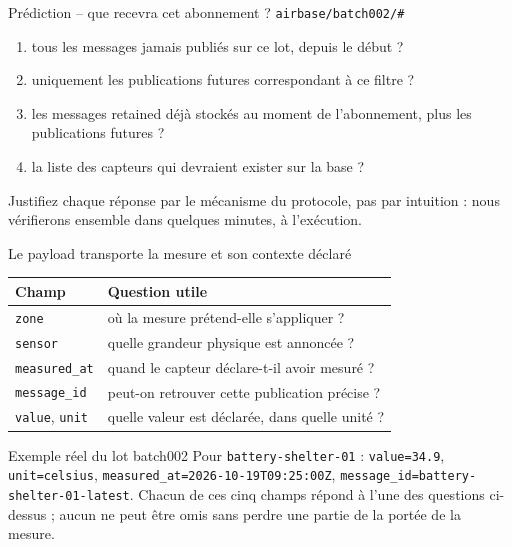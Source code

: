 \documentclass[aspectratio=169]{beamer}
\begin{document}
\begin{frame}{Prédiction -- que recevra cet abonnement ?}
\large\texttt{airbase/batch002/\#}
\begin{enumerate}
\item tous les messages jamais publiés sur ce lot, depuis le début ?
\item uniquement les publications futures correspondant à ce filtre ?
\item les messages retained déjà stockés au moment de l'abonnement, plus les publications futures ?
\item la liste des capteurs qui devraient exister sur la base ?
\end{enumerate}
Justifiez chaque réponse par le mécanisme du protocole, pas par intuition : nous vérifierons ensemble dans quelques minutes, à l'exécution.
\end{frame}

\begin{frame}{Le payload transporte la mesure et son contexte déclaré}
\small
\begin{tabular}{ll}
\toprule
Champ & Question utile \\
\midrule
\texttt{zone} & où la mesure prétend-elle s'appliquer ? \\
\texttt{sensor} & quelle grandeur physique est annoncée ? \\
\texttt{measured\_at} & quand le capteur déclare-t-il avoir mesuré ? \\
\texttt{message\_id} & peut-on retrouver cette publication précise ? \\
\texttt{value}, \texttt{unit} & quelle valeur est déclarée, dans quelle unité ? \\
\bottomrule
\end{tabular}
\begin{exampleblock}{Exemple réel du lot batch002}
Pour \texttt{battery-shelter-01} : \texttt{value=34.9}, \texttt{unit=celsius}, \texttt{measured\_at=2026-10-19T09:25:00Z}, \texttt{message\_id=battery-shelter-01-latest}. Chacun de ces cinq champs répond à l'une des questions ci-dessus ; aucun ne peut être omis sans perdre une partie de la portée de la mesure.
\end{exampleblock}
\end{frame}
\end{document}
